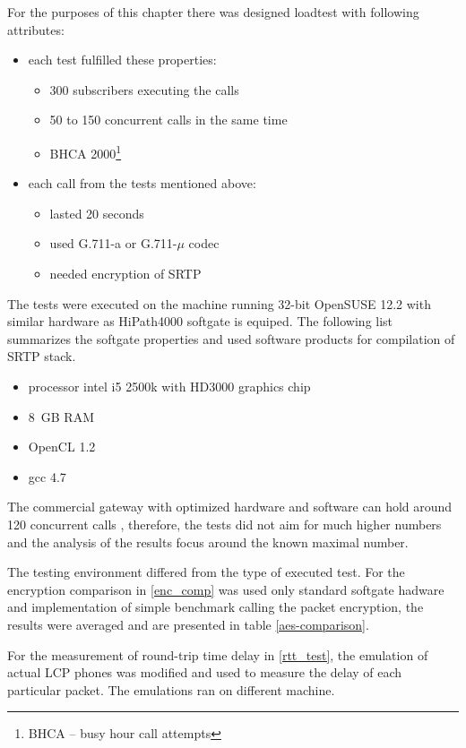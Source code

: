 For the purposes of this chapter there was designed loadtest with following
attributes:
\begin{itemize}
\item each test fulfilled these properties:
\vspace{-0.5em}
\begin{itemize}
\item 300 subscribers executing the calls
\item 50 to 150 concurrent calls in the same time\cite{hp4k}
\item BHCA 2000\footnote{ BHCA -- busy hour call attempts}
\end{itemize}
\item each call from the tests mentioned above:
\vspace{-0.5em}
\begin{itemize}
\item lasted 20 seconds
\item used G.711-a or G.711-$\mu$ codec
\item needed encryption of SRTP
\end{itemize}
\end{itemize}


The tests were executed on the machine running 32-bit OpenSUSE 12.2 with similar
hardware as HiPath4000 softgate is equiped. The following list summarizes the
softgate properties and used software products for compilation of SRTP stack.
\begin{itemize}
\item processor intel i5 2500k with HD3000 graphics chip
\item 8~GB RAM
\item OpenCL 1.2
\item gcc 4.7
\end{itemize}
 
The commercial gateway with optimized hardware and software can hold around 120 
concurrent calls \cite{hp4k}, therefore, the tests did not aim for much higher
numbers and the analysis of the results focus around the known maximal number.

The testing environment differed from the type of executed test. For the
encryption comparison in \ref{enc_comp} was used only standard softgate hadware 
and implementation of simple benchmark calling the packet encryption, the 
results were averaged and are presented in table \ref{aes-comparison}.

For the measurement of round-trip time delay in \ref{rtt_test}, the emulation of
actual LCP phones was modified and used to measure the delay of each particular
packet. The emulations ran on different machine.

